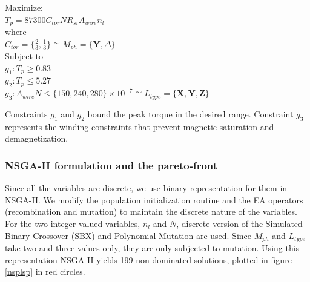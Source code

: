 \begin{singlespacing}
\begin{flushleft}

Maximize: \\
$ T_p = 87300 C_{tor} N R_{si} A_{wire} n_{l} $\\
where \\
$ C_{tor} = \{ \frac{2}{3}, \frac{1}{3} \} \cong M_{ph} = \{ \textbf{Y}, \Delta  \} $ 
\\[\baselineskip]


Subject to \\
$g_1: T_{p} \geqslant 0.83$ \\

$g_2: T_{p} \leqslant 5.27$ \\

$g_3: A_{wire}N \leqslant \{150, 240, 280\} \times 10^{-7} \cong L_{type} = \{ \textbf{X}, \textbf{Y}, \textbf{Z} \}$

\end{flushleft}

\end{singlespacing}

Constraints $g_1$ and $g_2$ bound the peak torque in the desired
range. Constraint $g_3$ represents the winding constraints that prevent
magnetic saturation and demagnetization.

\subsubsection{NSGA-II formulation and the pareto-front}
Since all the variables are discrete, we use binary representation for them
in NSGA-II. We modify the population initialization routine and the EA
operators (recombination and mutation) to maintain the discrete nature of
the variables. For the two integer valued variables, $n_l$ and $N$,
discrete version of the Simulated Binary Crossover (SBX) and Polynomial
Mutation \citep{deb01} are used. Since $M_{ph}$ and $L_{type}$ take two
and three values only, they are only subjected to mutation. Using this
representation NSGA-II yields 199 non-dominated solutions, plotted in
figure \ref{nsplsp} in red circles.


